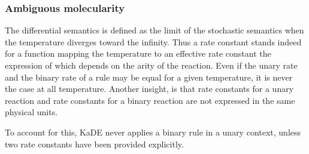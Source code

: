 \documentclass[11pt]{book}
\def\KaDE{\textsf{KaDE}}
\begin{document}
  \subsubsection{Ambiguous molecularity}

The differential semantics is defined as the limit of the stochastic semantics when the temperature diverges toward the infinity. Thus a rate constant stands indeed for a function mapping the temperature to an effective rate constant the expression of which depends on the arity of the reaction. Even if the unary rate and the binary rate of a rule may be equal for a given temperature, it is never the case at all temperature. Another insight, is that rate constants for a unary reaction and rate constants for a binary reaction are not expressed in the same physical units.

To account for this, {\KaDE} never applies a binary rule in a
  unary context, unless two rate constants have been provided explicitly.
\end{document}
